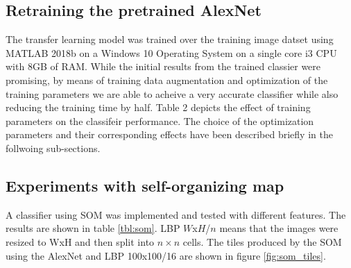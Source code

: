 \documentclass[doc/report.tex]{subfiles}
\begin{document}
\subsection{Retraining the pretrained AlexNet}
The transfer learning model was trained over the training image datset using MATLAB 2018b on a Windows 10 Operating System on a single core i3 CPU with 8GB of RAM. While the initial results from the trained classier were promising, by means of training data augmentation and optimization of the training parameters we are able to acheive a very accurate classifier while also reducing the training time by half. Table 2 depicts the effect of training parameters on the classifeir performance. The choice of the optimization parameters and their corresponding effects have been described briefly in the follwoing sub-sections.

\begin{table}[h]
\centering
\caption{Training Parameter Analysis}
\label{tab:my-table2}
\end{table}

\subsection{Experiments with self-organizing map}
A classifier using SOM was implemented and tested with different features.  The
results are shown in table \ref{tbl:som}. LBP $W$x$H$/$n$ means that the images
were resized to WxH and then split into $n\times n$ cells. The tiles produced
by the SOM using the AlexNet and LBP 100x100/16 are shown in figure
\ref{fig:som_tiles}.
    
\end{document}
